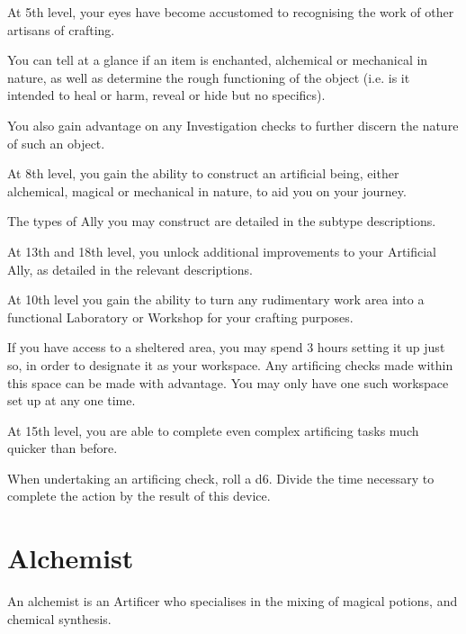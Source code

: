 {
	At 5th level, your eyes have become accustomed to recognising the work of other artisans of crafting. 
	
	You can tell at a glance if an item is enchanted, alchemical or mechanical in nature, as well as determine the rough functioning of the object (i.e. is it intended to heal or harm, reveal or hide \minus{} but no specifics). 
	
	You also gain advantage on any Investigation checks to further discern the nature of such an object.  
}

{
	At 8th level, you gain the ability to construct an artificial being, either alchemical, magical or mechanical in nature, to aid you on your journey. 
	
	The types of Ally you may construct are detailed in the subtype descriptions. 
	
	At 13th and 18th level, you unlock additional improvements to your Artificial Ally, as detailed in the relevant descriptions. 
}

{
	At 10th level you gain the ability to turn any rudimentary work area into a functional Laboratory or Workshop for your crafting purposes. 
	
	If you have access to a sheltered area, you may spend 3 hours setting it up just so, in order to designate it as your workspace. Any artificing checks made within this space can be made with advantage. You may only have one such workspace set up at any one time. 
}

{
	At 15th level, you are able to complete even complex artificing tasks much quicker than before. 
	
	When undertaking an artificing check, roll a d6. Divide the time necessary to complete the action by the result of this device. 
}

\section*{Alchemist}

An alchemist is an Artificer who specialises in the mixing of magical potions, and chemical synthesis. 

